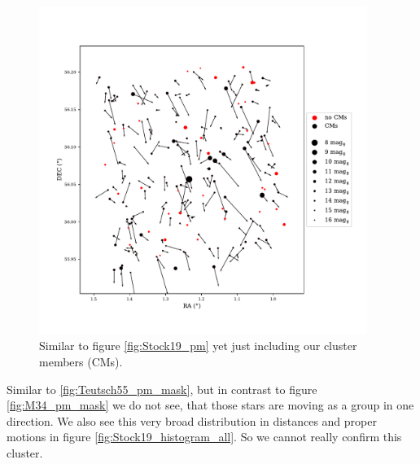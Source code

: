 \documentclass{article}
\begin{document}
\begin{figure}[H]
  \centering
    \includegraphics[trim={0 1.6cm 0 2.3cm},clip,width=0.95\textwidth]{Stock19_pm_mask.pdf}
  \caption{Similar to figure \ref{fig:Stock19_pm} yet just including our cluster members (CMs).}
  \label{fig:Stock19_pm_mask}
\end{figure}

Similar to \ref{fig:Teutsch55_pm_mask}, but in contrast to figure \ref{fig:M34_pm_mask} we do not see, that those stars are moving as a group in one direction. We also see this very broad distribution in distances and proper motions in figure \ref{fig:Stock19_histogram_all}. So we cannot really confirm this cluster.
\end{document}
